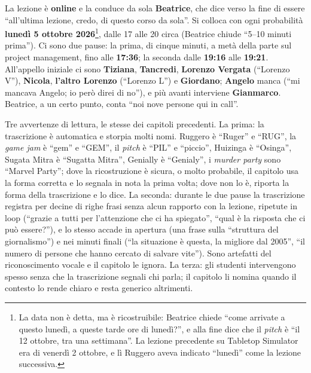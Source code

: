 La lezione è \textbf{online} e la conduce da sola \textbf{Beatrice}, che dice
verso la fine di essere ``all'ultima lezione, credo, di questo corso da sola''. Si
colloca con ogni probabilità \textbf{lunedì 5 ottobre 2026}\footnote{La data non è
detta, ma è ricostruibile: Beatrice chiede ``come arrivate a questo lunedì, a queste
tarde ore di lunedì?'', e alla fine dice che il \emph{pitch} è ``il 12 ottobre, tra
una settimana''. La lezione precedente su Tabletop Simulator era di venerdì 2
ottobre, e lì Ruggero aveva indicato ``lunedì'' come la lezione successiva.}, dalle
17 alle 20 circa (Beatrice chiude ``5--10 minuti prima''). Ci sono due pause: la
prima, di cinque minuti, a metà della parte sul project management, fino alle
\textbf{17:36}; la seconda dalle \textbf{19:16} alle \textbf{19:21}. All'appello
iniziale ci sono \textbf{Tiziana}, \textbf{Tancredi}, \textbf{Lorenzo Vergata}
(``Lorenzo V''), \textbf{Nicola}, \textbf{l'altro Lorenzo} (``Lorenzo L'') e
\textbf{Giordano}; \textbf{Angelo} manca (``mi mancava Angelo; io però direi di
no''), e più avanti interviene \textbf{Gianmarco}. Beatrice, a un certo punto, conta
``noi nove persone qui in call''.

Tre avvertenze di lettura, le stesse dei capitoli precedenti. La prima: la
trascrizione è automatica e storpia molti nomi. Ruggero è ``Ruger'' e ``RUG'', la
\emph{game jam} è ``gem'' e ``GEM'', il \emph{pitch} è ``PIL'' e ``piccio'',
Huizinga è ``Osinga'', Sugata Mitra è ``Sugatta Mitra'', Genially è ``Genialy'', i
\emph{murder party} sono ``Marvel Party''; dove la ricostruzione è sicura, o molto
probabile, il capitolo usa la forma corretta e lo segnala in nota la prima volta; dove
non lo è, riporta la forma della trascrizione e lo dice. La seconda: durante le due
pause la trascrizione registra per decine di righe frasi senza alcun rapporto con la
lezione, ripetute in loop (``grazie a tutti per l'attenzione che ci ha spiegato'',
``qual è la risposta che ci può essere?''), e lo stesso accade in apertura (una frase
sulla ``struttura del giornalismo'') e nei minuti finali (``la situazione è questa, la
migliore dal 2005'', ``il numero di persone che hanno cercato di salvare vite''). Sono
artefatti del riconoscimento vocale e il capitolo le ignora. La terza: gli studenti
intervengono spesso senza che la trascrizione segnali chi parla; il capitolo li nomina
quando il contesto lo rende chiaro e resta generico altrimenti.

